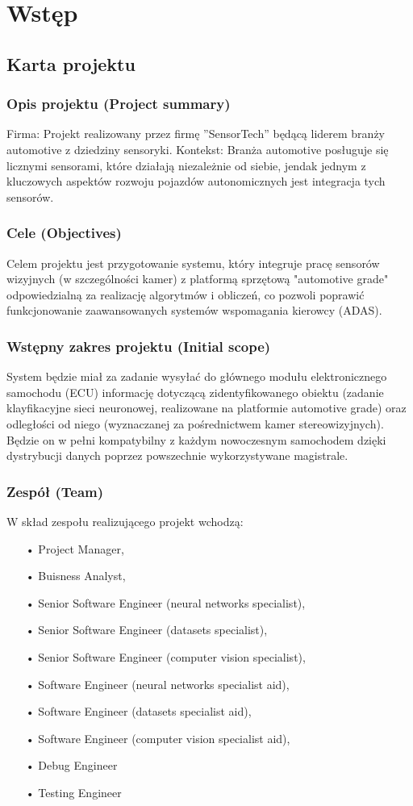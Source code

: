 \chapter{Wstęp}
\section{Karta projektu}
\subsection{Opis projektu (Project summary)}
Firma:
Projekt realizowany przez firmę ''SensorTech'' będącą liderem branży automotive z dziedziny sensoryki.
Kontekst:
Branża automotive posługuje się licznymi sensorami, które działają niezależnie od siebie, jendak jednym z kluczowych aspektów rozwoju pojazdów autonomicznych jest integracja tych sensorów.
\subsection{Cele (Objectives)}
Celem projektu jest przygotowanie systemu, który integruje pracę sensorów wizyjnych (w szczególności kamer) z platformą sprzętową "automotive grade" odpowiedzialną za realizację algorytmów i obliczeń, co pozwoli poprawić funkcjonowanie zaawansowanych systemów wspomagania kierowcy (ADAS). 
\subsection{Wstępny zakres projektu (Initial scope)}
System będzie miał za zadanie wysyłać do głównego modułu elektronicznego samochodu (ECU) informację dotyczącą zidentyfikowanego obiektu (zadanie klayfikacyjne sieci neuronowej, realizowane na platformie automotive grade) oraz odległości od niego (wyznaczanej za pośrednictwem kamer stereowizyjnych). Będzie on w pełni kompatybilny z każdym nowoczesnym samochodem dzięki dystrybucji danych poprzez powszechnie wykorzystywane magistrale. 
\subsection{Zespół (Team)}
W skład zespołu realizującego projekt wchodzą:
\begin{itemize}
\item[•] Project Manager,
\item[•] Buisness Analyst,
\item[•] Senior Software Engineer (neural networks specialist),
\item[•] Senior Software Engineer (datasets specialist),
\item[•] Senior Software Engineer (computer vision specialist),
\item[•] Software Engineer (neural networks specialist aid),
\item[•] Software Engineer (datasets specialist aid),
\item[•] Software Engineer (computer vision specialist aid),
\item[•] Debug Engineer
\item[•] Testing Engineer
\end{itemize}
